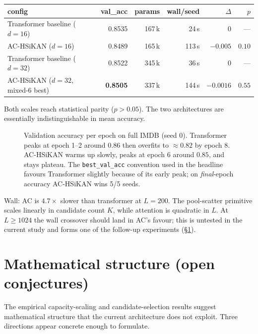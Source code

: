\documentclass[11pt, a4paper]{article}
\begin{document}
\begin{center}
\begin{tabular}{lrrrrr}
\toprule
config &  val\_acc & params & wall/seed & $\Delta$ & $p$ \\
\midrule
Transformer baseline ($d=16$)        & 0.8535 & 167\,k &  24\,s & 0 & --- \\
AC-HSiKAN ($d=16$)                    & 0.8489 & 165\,k & 113\,s & $-0.005$ & $0.10$ \\
Transformer baseline ($d=32$)        & 0.8522 & 345\,k &  36\,s & 0 & --- \\
AC-HSiKAN ($d=32$, mixed-6 best)     & \textbf{0.8505} & 337\,k & 144\,s & $\mathbf{-0.0016}$ & $\mathbf{0.55}$ \\
\bottomrule
\end{tabular}
\end{center}

Both scales reach statistical parity ($p > 0.05$). The two architectures
are essentially indistinguishable in mean accuracy.

\begin{figure}[t]
  \centering
  
  \caption{Validation accuracy per epoch on full IMDB (seed 0).
  Transformer peaks at epoch 1--2 around $0.86$ then overfits to
  $\approx 0.82$ by epoch 8. AC-HSiKAN warms up slowly, peaks at
  epoch 6 around $0.85$, and stays plateau. The
  \texttt{best\_val\_acc} convention used in the headline favours
  Transformer slightly because of its early peak; on \emph{final}-epoch
  accuracy AC-HSiKAN wins 5/5 seeds.}
  \label{fig:training}
\end{figure}

Wall: AC is $4.7\times$ slower than transformer at $L = 200$. The
pool-scatter primitive scales linearly in candidate count $K$, while
attention is quadratic in $L$. At $L \geq 1024$ the wall crossover
should land in AC's favour; this is untested in the current study and
forms one of the follow-up experiments
(\S\ref{sec:future}).

\section{Mathematical structure (open conjectures)}
\label{sec:future}

The empirical capacity-scaling and candidate-selection results suggest
mathematical structure that the current architecture does not exploit.
Three directions appear concrete enough to formulate.
\end{document}
